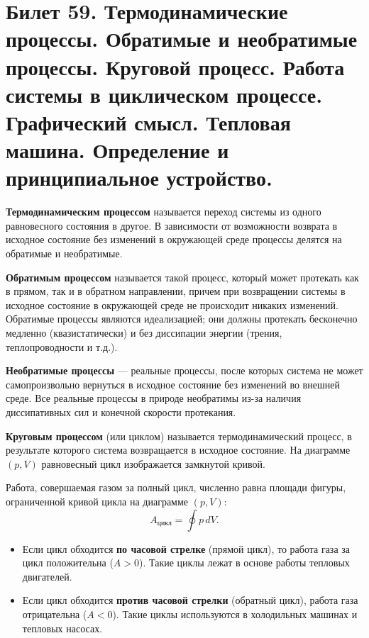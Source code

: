 \section{Билет 59. Термодинамические процессы. Обратимые и необратимые процессы. Круговой процесс. Работа системы в циклическом процессе. Графический смысл. Тепловая машина. Определение и принципиальное устройство.}

\begin{definition}
\textbf{Термодинамическим процессом} называется переход системы из одного равновесного состояния в другое. В зависимости от возможности возврата в исходное состояние без изменений в окружающей среде процессы делятся на обратимые и необратимые.
\end{definition}

\begin{definition}
\textbf{Обратимым процессом} называется такой процесс, который может протекать как в прямом, так и в обратном направлении, причем при возвращении системы в исходное состояние в окружающей среде не происходит никаких изменений. Обратимые процессы являются идеализацией; они должны протекать бесконечно медленно (квазистатически) и без диссипации энергии (трения, теплопроводности и т.д.).
\par\noindent\textbf{Необратимые процессы} --- реальные процессы, после которых система не может самопроизвольно вернуться в исходное состояние без изменений во внешней среде. Все реальные процессы в природе необратимы из-за наличия диссипативных сил и конечной скорости протекания.
\end{definition}

\begin{definition}
\textbf{Круговым процессом} (или циклом) называется термодинамический процесс, в результате которого система возвращается в исходное состояние. На диаграмме $(p, V)$ равновесный цикл изображается замкнутой кривой.
\end{definition}

\begin{property}
Работа, совершаемая газом за полный цикл, численно равна площади фигуры, ограниченной кривой цикла на диаграмме $(p, V)$:
\begin{equation}
    A_{\text{цикл}} = \oint p \, dV.
\end{equation}
\begin{itemize}
    \item Если цикл обходится \textbf{по часовой стрелке} (прямой цикл), то работа газа за цикл положительна ($A > 0$). Такие циклы лежат в основе работы тепловых двигателей.
    \item Если цикл обходится \textbf{против часовой стрелки} (обратный цикл), работа газа отрицательна ($A < 0$). Такие циклы используются в холодильных машинах и тепловых насосах.
\end{itemize}
\end{property}

